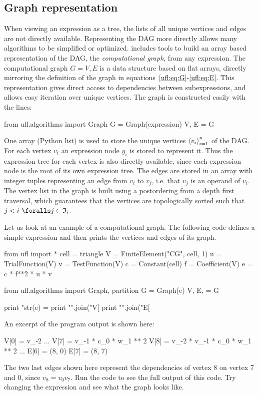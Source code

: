 \subsection{Graph representation} \label{ufl:sec:graphs}

When viewing an expression as a tree, the lists of all unique vertices
and edges are not directly available. Representing the DAG more
directly allows many algorithms to be simplified or optimized.
\ufl{} includes tools to build an array based representation of the DAG,
the \emph{computational graph}, from any expression.
The computational graph $G = V, E$ is a data structure based on flat
arrays, directly mirroring the definition of the graph in
equations~\eqref{ufl:eq:G}-\eqref{ufl:eq:E}.
This representation gives direct access to dependencies between
subexpressions, and allows easy iteration over unique vertices.
The graph is constructed easily with the lines:
\begin{python}
from ufl.algorithms import Graph
G = Graph(expression)
V, E = G
\end{python}
One array (Python list)
 is used to store the unique vertices $\left\langle{v_i}\right\rangle_{i=1}^n$ of the
DAG.  For each vertex $v_i$ an expression node $y_i$ is stored to
represent it.  Thus the expression tree for each vertex is also
directly available, since each expression node is the root of its own
expression tree. The edges are stored in an array  with
integer tuples  representing an edge from $v_i$ to $v_j$,
i.e. that $v_j$ is an operand of $v_i$.  The vertex list in the graph
is built using a postordering from a depth first traversal,
which guarantees that the vertices are topologically sorted
such that $j < i \,\, \foralls j \in \mI_i$.

Let us look at an example of a computational graph. The following code
defines a simple expression and then prints the vertices and edges
of its graph.
\begin{python}
from ufl import *
cell = triangle
V = FiniteElement("CG", cell, 1)
u = TrialFunction(V)
v = TestFunction(V)
c = Constant(cell)
f = Coefficient(V)
e = c * f**2 * u * v

from ufl.algorithms import Graph, partition
G = Graph(e)
V, E, = G

print "str(e) = %
print "\n".join("V[%
print "\n".join("E[%
\end{python}
An excerpt of the program output is shown here:
\begin{gencode}
V[0] = v_{-2}
...
V[7] = v_{-1} * c_0 * w_1 ** 2
V[8] = v_{-2} * v_{-1} * c_0 * w_1 ** 2
...
E[6] = (8, 0)
E[7] = (8, 7)
\end{gencode}
The two last edges shown here represent the dependencies of vertex 8
on vertex 7 and 0, since $v_8 = v_0 v_7$. Run the code to see the full
output of this code.  Try changing the expression and see what the
graph looks like.

